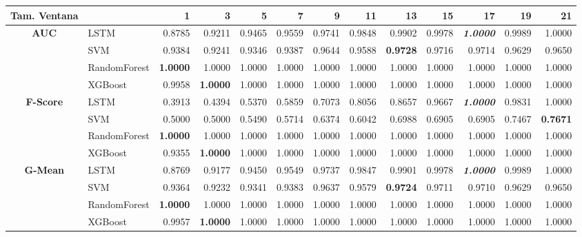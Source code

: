 \begin{table}[H]
\centering
\begin{adjustbox}{max width=14cm}
	\begin{tabular}{|c|l|r|r|r|r|r|r|r|r|r|r|r|}
		\hline
		\textbf{Tam. Ventana} &         &      1  &      3  &      5  &      7  &      9  &      11 &      13 &      15 &      17 &      19 &      21 \\
		\hline
		\textbf{AUC} &  LSTM &  0.8785 &  0.9211 &  0.9465 &  0.9559 &  0.9741 &  0.9848 &  0.9902 &  0.9978 & \textit{ \textbf{  1.0000 } } &  0.9989 &  1.0000 \\
		&  SVM &  0.9384 &  0.9241 &  0.9346 &  0.9387 &  0.9644 &  0.9588 & \textbf{  0.9728 } &  0.9716 &  0.9714 &  0.9629 &  0.9650 \\
		&  RandomForest & \textbf{  1.0000 } &  1.0000 &  1.0000 &  1.0000 &  1.0000 &  1.0000 &  1.0000 &  1.0000 &  1.0000 &  1.0000 &  1.0000 \\
		&  XGBoost &  0.9958 & \textbf{  1.0000 } &  1.0000 &  1.0000 &  1.0000 &  1.0000 &  1.0000 &  1.0000 &  1.0000 &  1.0000 &  1.0000 \\
		\hline
		\textbf{F-Score} &  LSTM &  0.3913 &  0.4394 &  0.5370 &  0.5859 &  0.7073 &  0.8056 &  0.8657 &  0.9667 & \textit{ \textbf{  1.0000 } } &  0.9831 &  1.0000 \\
		&  SVM &  0.5000 &  0.5000 &  0.5490 &  0.5714 &  0.6374 &  0.6042 &  0.6988 &  0.6905 &  0.6905 &  0.7467 & \textbf{  0.7671 } \\
		&  RandomForest & \textbf{  1.0000 } &  1.0000 &  1.0000 &  1.0000 &  1.0000 &  1.0000 &  1.0000 &  1.0000 &  1.0000 &  1.0000 &  1.0000 \\
		&  XGBoost &  0.9355 & \textbf{  1.0000 } &  1.0000 &  1.0000 &  1.0000 &  1.0000 &  1.0000 &  1.0000 &  1.0000 &  1.0000 &  1.0000 \\
		\hline
		\textbf{G-Mean} &  LSTM &  0.8769 &  0.9177 &  0.9450 &  0.9549 &  0.9737 &  0.9847 &  0.9901 &  0.9978 & \textit{ \textbf{  1.0000 } } &  0.9989 &  1.0000 \\
		&  SVM &  0.9364 &  0.9232 &  0.9341 &  0.9383 &  0.9637 &  0.9579 & \textbf{  0.9724 } &  0.9711 &  0.9710 &  0.9629 &  0.9650 \\
		&  RandomForest & \textbf{  1.0000 } &  1.0000 &  1.0000 &  1.0000 &  1.0000 &  1.0000 &  1.0000 &  1.0000 &  1.0000 &  1.0000 &  1.0000 \\
		&  XGBoost &  0.9957 & \textbf{  1.0000 } &  1.0000 &  1.0000 &  1.0000 &  1.0000 &  1.0000 &  1.0000 &  1.0000 &  1.0000 &  1.0000 \\

\end{tabular}
\end{adjustbox}
\end{table}
